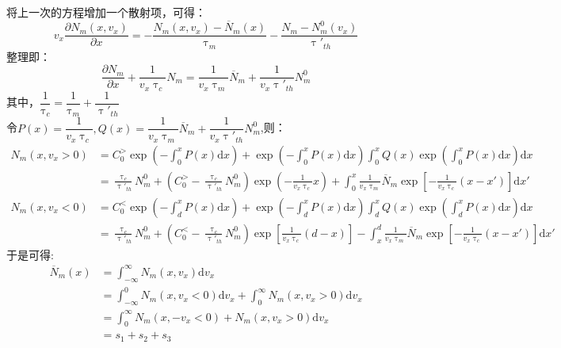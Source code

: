 \documentclass{article}
\begin{document}
	\noindent 将上一次的方程增加一个散射项，可得：
	\begin{equation}\label{eq:1}
		v_x\frac{\partial N_m(x,v_x)}{\partial x}=-\frac{N_m(x,v_x)-\overline{N}_m(x)}{\uptau_m}-\frac{N_m-N_m^0(v_x)}{\uptau'_{th}}
	\end{equation}
	整理即：
	\begin{equation}\label{eq:2}
		\frac{\partial N_m}{\partial x}+\frac{1}{v_x\uptau_c}N_m=\frac{1}{v_x\uptau_m}\overline{N}_m+\frac{1}{v_x\uptau'_{th}}N_m^0
	\end{equation}
	其中，$\dfrac{1}{\uptau_c}=\dfrac{1}{\uptau_m}+\dfrac{1}{\uptau'_{th}}$
	\\[0.5cm]
	令$P(x)=\dfrac{1}{v_x\uptau_c},Q(x)=\dfrac{1}{v_x\uptau_m}\overline{N}_m+\dfrac{1}{v_x\uptau'_{th}}N_m^0$,则：
	\begin{equation}\label{eq:3}
		\begin{aligned}
		N_m(x,v_x>0)&=C_0^>\exp(-\int_0^xP(x)\mathrm{d}x)+\exp(-\int_0^xP(x)\mathrm{d}x)\int_0^xQ(x)\exp(\int_0^xP(x)\mathrm{d}x)\mathrm{d}x\\
			&=\frac{\uptau_c}{\uptau'_{th}}N_m^0+(C_0^>-\frac{\uptau_c}{\uptau'_{th}}N_m^0)\exp(-\frac{1}{v_x\uptau_c}x)+\int_0^x\frac{1}{v_x\uptau_m}\overline{N}_m\exp[-\frac{1}{v_x\uptau_c}(x-x')]\mathrm{d}x'	
		\end{aligned}
	\end{equation}
	\begin{equation}\label{eq:4}
		\begin{aligned}
		N_m(x,v_x<0)&=C_0^<\exp(-\int_d^xP(x)\mathrm{d}x)+\exp(-\int_d^xP(x)\mathrm{d}x)\int_d^xQ(x)\exp(\int_d^xP(x)\mathrm{d}x)\mathrm{d}x\\
			&=\frac{\uptau_c}{\uptau'_{th}}N_m^0+(C_0^<-\frac{\uptau_c}{\uptau'_{th}}N_m^0)\exp[\frac{1}{v_x\uptau_c}(d-x)]-\int_x^d\frac{1}{v_x\uptau_m}\overline{N}_m\exp[-\frac{1}{v_x\uptau_c}(x-x')]\mathrm{d}x'	
		\end{aligned}
	\end{equation}
	于是可得:
	\begin{equation}\label{eq:5}
		\begin{aligned}
			\overline{N}_m(x)&=\int_{-\infty}^{\infty}N_m(x,v_x)\mathrm{d}v_x\\
			&=\int_{-\infty}^0N_m(x,v_x<0)\mathrm{d}v_x+\int_0^{\infty}N_m(x,v_x>0)\mathrm{d}v_x\\
			&=\int_0^{\infty}N_m(x,-v_x<0)+N_m(x,v_x>0)\mathrm{d}v_x\\
			&=s_1+s_2+s_3
		\end{aligned}
	\end{equation}
\end{document}
